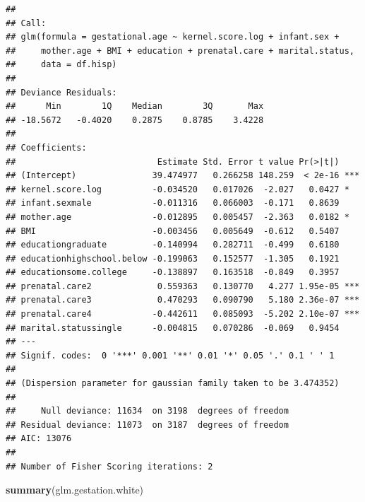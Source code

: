 \documentclass[
  12pt,
]{article}
\newenvironment{Shaded}{\begin{snugshade}}{\end{snugshade}}
\newcommand{\KeywordTok}[1]{\textcolor[rgb]{0.13,0.29,0.53}{\textbf{#1}}}
\newcommand{\NormalTok}[1]{#1}
\begin{document}
\begin{verbatim}
## 
## Call:
## glm(formula = gestational.age ~ kernel.score.log + infant.sex + 
##     mother.age + BMI + education + prenatal.care + marital.status, 
##     data = df.hisp)
## 
## Deviance Residuals: 
##      Min        1Q    Median        3Q       Max  
## -18.5672   -0.4020    0.2875    0.8785    3.4228  
## 
## Coefficients:
##                            Estimate Std. Error t value Pr(>|t|)    
## (Intercept)               39.474977   0.266258 148.259  < 2e-16 ***
## kernel.score.log          -0.034520   0.017026  -2.027   0.0427 *  
## infant.sexmale            -0.011316   0.066003  -0.171   0.8639    
## mother.age                -0.012895   0.005457  -2.363   0.0182 *  
## BMI                       -0.003456   0.005649  -0.612   0.5407    
## educationgraduate         -0.140994   0.282711  -0.499   0.6180    
## educationhighschool.below -0.199063   0.152577  -1.305   0.1921    
## educationsome.college     -0.138897   0.163518  -0.849   0.3957    
## prenatal.care2             0.559363   0.130770   4.277 1.95e-05 ***
## prenatal.care3             0.470293   0.090790   5.180 2.36e-07 ***
## prenatal.care4            -0.442611   0.085093  -5.202 2.10e-07 ***
## marital.statussingle      -0.004815   0.070286  -0.069   0.9454    
## ---
## Signif. codes:  0 '***' 0.001 '**' 0.01 '*' 0.05 '.' 0.1 ' ' 1
## 
## (Dispersion parameter for gaussian family taken to be 3.474352)
## 
##     Null deviance: 11634  on 3198  degrees of freedom
## Residual deviance: 11073  on 3187  degrees of freedom
## AIC: 13076
## 
## Number of Fisher Scoring iterations: 2
\end{verbatim}

\begin{Shaded}
\begin{Highlighting}[]
\KeywordTok{summary}\NormalTok{(glm.gestation.white)}
\end{Highlighting}
\end{Shaded}
\end{document}
